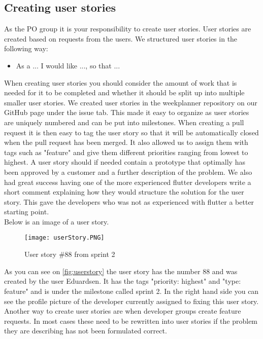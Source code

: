 \subsection{Creating user stories}
As the PO group it is your responsibility to create user stories.
User stories are created based on requests from the users.
We structured user stories in the following way:
\begin{itemize}
    \item As a ... I would like ..., so that ...
\end{itemize}

When creating user stories you should consider the amount of work that is needed for it to be completed and whether it should be split up into multiple smaller user stories.
We created user stories in the weekplanner repository on our GitHub page under the issue tab.
This made it easy to organize as user stories are uniquely numbered and can be put into milestones.
When creating a pull request it is then easy to tag the user story so that it will be automatically closed when the pull request has been merged.
It also allowed us to assign them with tags such as "feature" and give them different priorities ranging from lowest to highest.
A user story should if needed contain a prototype that optimally has been approved by a customer and a further description of the problem.
We also had great success having one of the more experienced flutter developers write a short comment explaining how they would structure the solution for the user story.
This gave the developers who was not as experienced with flutter a better starting point.
\\
Below is an image of a user story.
\begin{figure}[h]
    \centering
    \texttt{[image: userStory.PNG]}
    \caption{User story \#88 from sprint 2}
    \label{fig:userstory}
\end{figure}
As you can see on \autoref{fig:userstory} the user story has the number 88 and was created by the user Eduardsen.
It has the tags "priority: highest" and "type: feature" and is under the milestone called sprint 2.
In the right hand side you can see the profile picture of the developer currently assigned to fixing this user story.
\\
Another way to create user stories are when developer groups create feature requests.
In most cases these need to be rewritten into user stories if the problem they are describing has not been formulated correct.


